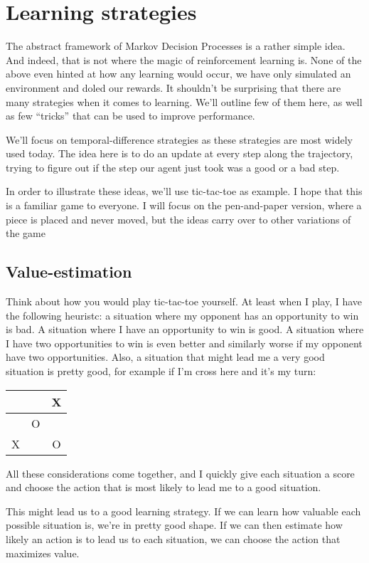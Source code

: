 \documentclass{article}
\theoremstyle{changedot}
\theoremstyle{changedotbreak}
\theoremstyle{nonumberplain}
\begin{document}
\section{Learning strategies}
The abstract framework of Markov Decision Processes is a rather simple idea. And indeed, that is not where the magic of reinforcement learning is. None of the above even hinted at how any learning would occur, we have only simulated an environment and doled our rewards. It shouldn't be surprising that there are many strategies when it comes to learning. We'll outline few of them here, as well as few ``tricks'' that can be used to improve performance.

We'll focus on temporal-difference strategies as these strategies are most widely used today. The idea here is to do an update at every step along the trajectory, trying to figure out if the step our agent just took was a good or a bad step.

In order to illustrate these ideas, we'll use tic-tac-toe as example. I hope that this is a familiar game to everyone. I will focus on the pen-and-paper version, where a piece is placed and never moved, but the ideas carry over to other variations of the game

\subsection{Value-estimation}
Think about how you would play tic-tac-toe yourself. At least when I play, I have the following heuristc: a situation where my opponent has an opportunity to win is bad. A situation where I have an opportunity to win is good. A situation where I have two opportunities to win is even better and similarly worse if my opponent have two opportunities. Also, a situation that might lead me a very good situation is pretty good, for example if I'm cross here and it's my turn:

\begin{tabular}{c|c|c}
    &   & X \\ \hline
    & O &   \\ \hline
  X &   & O
\end{tabular}

All these considerations come together, and I quickly give each situation a score and choose the action that is most likely to lead me to a good situation.

This might lead us to a good learning strategy. If we can learn how valuable each possible situation is, we're in pretty good shape. If we can then estimate how likely an action is to lead us to each situation, we can choose the action that maximizes value.
\end{document}
